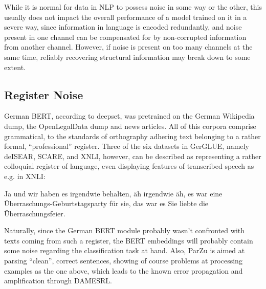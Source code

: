 While it is normal for data in NLP to possess noise in some way or the other, this usually does
not impact the overall performance of a model trained on it in a severe way, since information
in language is encoded redundantly, and noise present in one channel can be compensated for by
non-corrupted information from another channel. However, if noise
is present on too many channels at the same time, reliably recovering structural information may
break down to some extent.



\subsection{Register Noise}
\label{sec:register-noise}

German BERT, according to deepset, was pretrained on the German Wikipedia dump, the OpenLegalData dump and
news articles. All of this corpora comprise grammatical, to the standards of orthography adhering text
belonging to a rather formal, ``professional'' register. Three of the six datasets in GerGLUE, namely
deISEAR, SCARE, and XNLI, however, can be described as representing a rather colloquial register of
language, even displaying features of transcribed speech as e.g. in XNLI:

\begin{examples}
  \item Ja und wir haben es irgendwie behalten, äh irgendwie äh, es war eine Überraschungs-Geburtstagsparty für sie, das war es Sie liebte die Überraschungsfeier.
\end{examples}

Naturally, since the German BERT module probably wasn't confronted with texts coming from such a register,
the BERT embeddings will probably contain some noise regarding the classification task at hand. Also, ParZu
is aimed at parsing ``clean'', correct sentences, showing of course problems at processing examples as the
one above, which leads to the known error propagation and amplification through DAMESRL.

